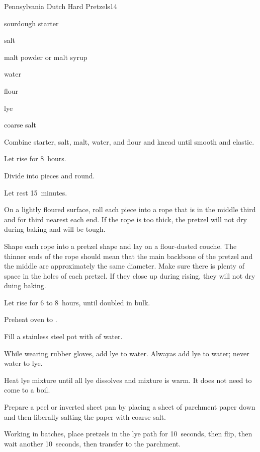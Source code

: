 \begin{recipe}{Pennsylvania Dutch Hard Pretzels}{}{14}

\begin{ingredients}
\item {} sourdough starter
\item {} salt
\item {} malt powder or malt syrup
\item {} water
\item {} flour
\item {} lye
\item coarse salt
\end{ingredients}

\begin{directions}
\item Combine starter, salt, malt, water, and flour and knead until smooth and elastic.
\item Let rise for 8~hours.
\item Divide into  pieces and round.
\item Let rest 15~minutes.
\item On a lightly floured surface, roll each piece into a rope that is \inch{\half} in the middle third and \inch{\quarter} for third nearest each end. If the rope is too thick, the pretzel will not dry during baking and will be tough.
\item Shape each rope into a pretzel shape and lay on a flour-dusted couche. The thinner ends of the rope should mean that the main backbone of the pretzel and the middle are approximately the same diameter. Make sure there is plenty of space in the holes of each pretzel. If they close up during rising, they will not dry duing baking.
\item Let rise for 6 to 8~hours, until doubled in bulk.
\item Preheat oven to .
\item Fill a stainless steel pot with  of water.
\item While wearing rubber gloves, add lye to water. Alwayas add lye to water; never water to lye.
\item Heat lye mixture until all lye dissolves and mixture is warm. It does not need to come to a boil.
\item Prepare a peel or inverted sheet pan by placing a sheet of parchment paper down and then liberally salting the paper with coarse salt.
\item Working in batches, place pretzels in the lye path for 10~seconds, then flip, then wait another 10~seconds, then transfer to the parchment.

\end{directions}
\end{recipe}
